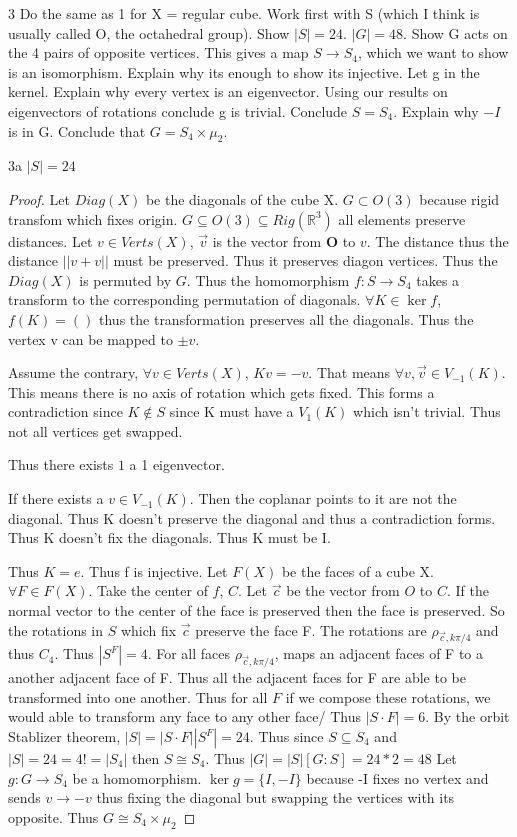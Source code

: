 \documentclass{article}
\newcommand{\R}{\mathbb{R}}
\begin{document}
\begin{PROB}{3}\label{Problem 3.}
    Do the same as 1 for X = regular cube. Work first with S (which I think is usually called O, the octahedral group). Show $|S| = 24$. $|G| = 48$. Show G acts on the 4 pairs of opposite vertices. This gives a map $S \to S_4$, which we want to show is an isomorphism. Explain why its enough to show its injective. Let g in the kernel. Explain why every vertex is an eigenvector. Using our results on eigenvectors of rotations conclude g is trivial.  Conclude $S = S_4$. Explain why $-I$ is in G. Conclude that $G = S_4 \times \mu_2$.  
\end{PROB}
\begin{claim}{3a}
    $|S| = 24$
\end{claim}
\begin{proof}
    Let $Diag(X)$ be the diagonals of the cube X. $G \subset O(3)$ because rigid transfom which fixes origin. $G \subseteq O(3) \subseteq Rig(\R^3)$ all elements preserve distances. Let $v \in Verts(X)$, $\vec{v}$ is the vector from $\textbf{O}$ to $v$. The distance thus the distance $||v + v||$ must be preserved. Thus it preserves diagon vertices. Thus the $Diag(X)$ is permuted by $G$. Thus the homomorphism $f: S \to S_4$ takes a transform to the corresponding permutation of diagonals. $\forall K \in \ker f$, $f(K) = ()$ thus the transformation preserves all the diagonals. Thus the vertex v can be mapped to $\pm v$. 
    
    
    Assume the contrary, $\forall v \in Verts(X)$, $Kv = -v$. That means $\forall v, \vec{v} \in V_{-1}(K)$. This means there is no axis of rotation which gets fixed. This forms a contradiction since $K \not \in S$ since K must have a $V_1(K)$ which isn't trivial. Thus not all vertices get swapped. 

    Thus there exists $1$ a 1 eigenvector.

    If there exists a $v \in V_{-1}(K)$. Then the coplanar points to it are not the diagonal. Thus K doesn't preserve the diagonal and thus a contradiction forms. Thus K doesn't fix the diagonals. Thus K must be I.

    Thus $K = e$. Thus f is injective. Let $F(X)$ be the faces of a cube X. $\forall F \in F(X)$. Take the center of $f$, $C$. Let $\vec{c}$ be the vector from $O$ to $C$. If the normal vector to the center of the face is preserved then the face is preserved. So the rotations in $S$ which fix $\vec{c}$ preserve the face F. The rotations are $\rho_{\vec{c}, k\pi/4}$ and thus $C_4$. Thus $|S^F| = 4$. For all faces $\rho_{\vec{c}, k\pi/4}$, maps an adjacent faces of F to a another adjacent face of F. Thus all the adjacent faces for F are able to be transformed into one another. Thus for all $F$ if we compose these rotations, we would able to transform any face to any other face/ Thus $|S \cdot F| = 6$. By the orbit Stablizer theorem, $|S| = |S\cdot F||S^F| = 24$. Thus since $S \subseteq S_4$ and $|S| = 24 = 4! = |S_4|$ then $S \cong S_4$. Thus $|G| = |S|[G:S] = 24 * 2 = 48$ Let $g: G \to S_4$ be a homomorphism. $\ker g = \{I, -I\}$ because -I fixes no vertex and sends $v \to -v$ thus fixing the diagonal but swapping the vertices with its opposite. Thus $G \cong S_4 \times \mu_2$
\end{proof}
\end{document}
